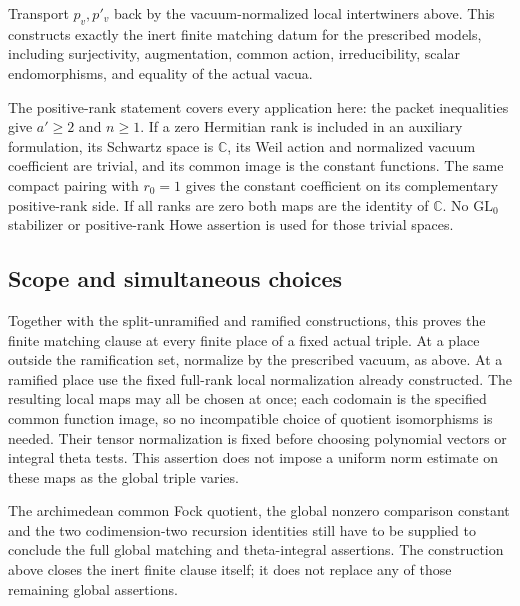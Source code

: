 Transport \(p_v,p'_v\) back by the vacuum-normalized local
intertwiners above. This constructs exactly the inert
finite matching datum for the prescribed models, including
surjectivity, augmentation, common action, irreducibility,
scalar endomorphisms, and equality of the actual vacua.

The positive-rank statement covers every application here:
the packet inequalities give \(a'\ge2\) and \(n\ge1\).
If a zero Hermitian rank is included in an auxiliary formulation,
its Schwartz space is \(\mathbb C\), its Weil action and
normalized vacuum coefficient are trivial, and its common
image is the constant functions. The same compact pairing
with \(r_0=1\) gives the constant coefficient on its
complementary positive-rank side. If all ranks are zero
both maps are the identity of \(\mathbb C\).
No \(\mathrm{GL}_0\) stabilizer or positive-rank Howe assertion
is used for those trivial spaces.

\subsection{Scope and simultaneous choices}
Together with the split-unramified and ramified constructions,
this proves the finite matching clause at every finite place
of a fixed actual triple. At a place outside the ramification
set, normalize by the prescribed vacuum, as above.
At a ramified place use the fixed full-rank local normalization
already constructed. The resulting local maps may all be
chosen at once; each codomain is the specified common
function image, so no incompatible choice of quotient
isomorphisms is needed. Their tensor normalization is fixed
before choosing polynomial vectors or integral theta tests.
This assertion does not impose a uniform norm estimate on
these maps as the global triple varies.

The archimedean common Fock quotient, the global nonzero
comparison constant and the two codimension-two recursion
identities still have to be supplied to conclude the full
global matching and theta-integral assertions. The construction
above closes the inert finite clause itself; it does not
replace any of those remaining global assertions.
